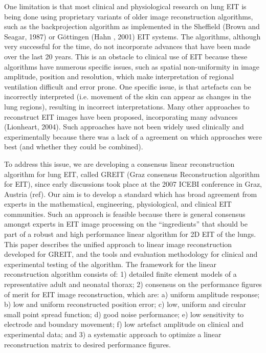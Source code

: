 \documentclass[12pt]{iopart}
\begin{document}
One limitation is that most clinical and physiological research
on lung EIT is being done using proprietary variants of
older image reconstruction algorithms, such as the backprojection
algorithm as implemented
in the Sheffield (Brown and Seagar, 1987)
or G\"ottingen (Hahn \etal, 2001) EIT systems.
The algorithms, although very successful for the time,
   do not incorporate advances that have been made over the last
   20 years.
This is an obstacle to clinical use of EIT because
these algorithms have numerous specific issues, such
   as spatial non-uniformity in image amplitude, position
   and resolution, which make interpretation of regional
   ventilation difficult and error prone.
One specific issue, is that 
artefacts can be incorrectly interpreted (i.e. movement of
   the skin can appear as changes in the lung regions),
   resulting in incorrect interpretations.
Many other approaches to reconstruct EIT images have been
proposed, incorporating many advances (Lionheart, 2004).
Such approaches
have not been widely used clinically and experimentally
because there was a lack of a agreement on which
approaches were best (and whether they could be combined).

To address this issue, we are developing a
consensus linear reconstruction algorithm for lung EIT,
called GREIT (Graz consensus Reconstruction algorithm for EIT),
since early discussions took place at the 2007 ICEBI conference
in Graz, Austria (ref). Our aim is to develop a standard which
has broad agreement from experts in the mathematical,
engineering, physiological, and clinical EIT communities.
Such an approach is feasible because there is general
consensus amongst experts in EIT image processing on
the ``ingredients'' that should
be part of a robust and high performance linear algorithm
for 2D EIT of the lungs.
This paper describes the unified approach to 
linear image reconstruction developed for GREIT,
and the tools and evaluation methodology for
clinical and experimental testing of the algorithm.
The framework for the linear reconstruction algorithm
consists of:
1) detailed finite element models of a representative
 adult and neonatal thorax;
2) consensus on the performance figures of merit for
 EIT image reconstruction, which are:
a) uniform amplitude response; b) low and uniform reconstructed position error; c) low, uniform and circular small point spread function; d) good noise performance; e) low sensitivity to electrode and boundary movement; f) low artefact amplitude on clinical and experimental data;
and
3) a systematic approach to optimize a linear reconstruction
 matrix to desired performance figures.
\end{document}
